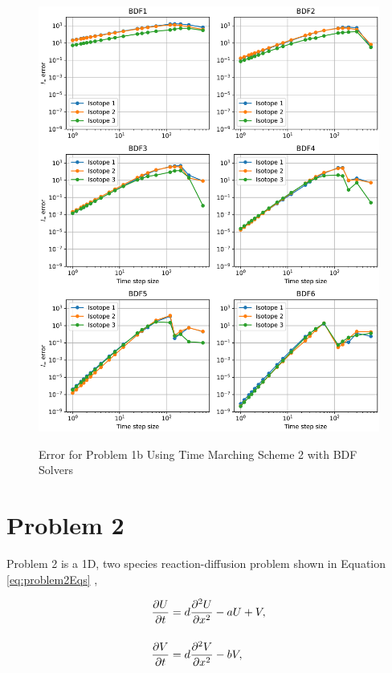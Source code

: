 \begin{figure}[t]
  \centering
  \includegraphics[width=6.5in]{images/problem1bMethod2Int.png}\\
  \caption{Error for Problem 1b Using Time Marching Scheme 2 with BDF Solvers}
  \label{fig:errorProblem1bTimeMarchingScheme2Int}
\end{figure} 

\FloatBarrier

\section{Problem 2}
Problem 2 is a 1D, two species reaction-diffusion problem shown in Equation \ref{eq:problem2Eqs} \cite{ching2007},

\begin{equation}
\setlength{\jot}{15pt}
\begin{split}
    \frac{\partial U}{\partial t} &= d\frac{\partial^{2}U}{\partial x^{2}} - aU + V, \\
    \frac{\partial V}{\partial t} &=
    d\frac{\partial^{2}V}{\partial x^{2}} - bV,
\end{split}
    \label{eq:problem2Eqs}
\end{equation}

